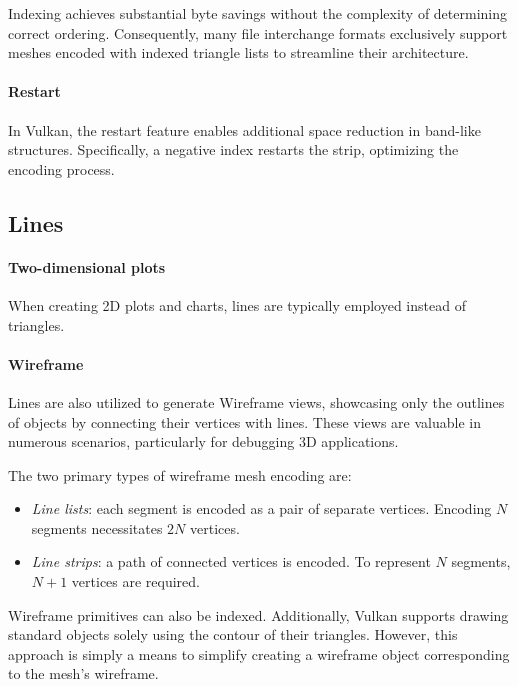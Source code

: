 Indexing achieves substantial byte savings without the complexity of determining correct ordering. 
Consequently, many file interchange formats exclusively support meshes encoded with indexed triangle lists to streamline their architecture.

\paragraph*{Restart}
In Vulkan, the restart feature enables additional space reduction in band-like structures. 
Specifically, a negative index restarts the strip, optimizing the encoding process.

\subsection{Lines}
\paragraph*{Two-dimensional plots}
When creating 2D plots and charts, lines are typically employed instead of triangles.

\paragraph*{Wireframe}
Lines are also utilized to generate Wireframe views, showcasing only the outlines of objects by connecting their vertices with lines. 
These views are valuable in numerous scenarios, particularly for debugging 3D applications.

The two primary types of wireframe mesh encoding are:
\begin{itemize}
    \item \textit{Line lists}: each segment is encoded as a pair of separate vertices. 
        Encoding $N$ segments necessitates $2N$ vertices.
    \item \textit{Line strips}: a path of connected vertices is encoded. 
        To represent $N$ segments, $N+1$ vertices are required.
\end{itemize}
Wireframe primitives can also be indexed. 
Additionally, Vulkan supports drawing standard objects solely using the contour of their triangles. 
However, this approach is simply a means to simplify creating a wireframe object corresponding to the mesh's wireframe.